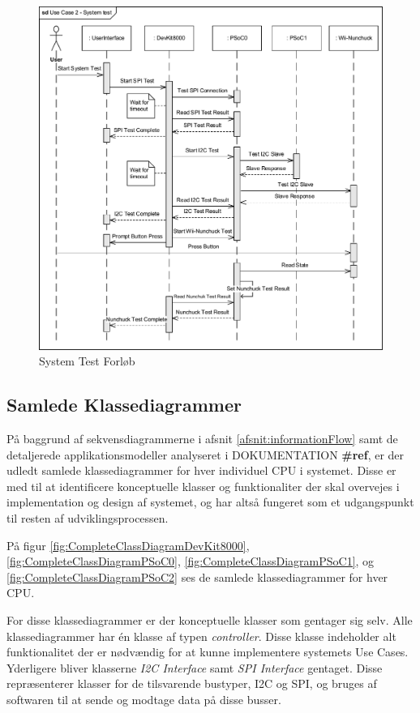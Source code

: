 \begin{figure}[H]
	\centering
	\includegraphics[width=\textwidth] {Systemarkitektur/images/SequenceDiagramUC2}
	\caption{System Test Forløb}
	\label{fig:SystemTestSekvensDiagram}
\end{figure}

\subsection{Samlede Klassediagrammer}
På baggrund af sekvensdiagrammerne i afsnit \ref{afsnit:informationFlow} samt de detaljerede applikationsmodeller analyseret i DOKUMENTATION \textbf{\#ref}, er der udledt samlede klassediagrammer for hver individuel CPU i systemet. Disse er med til at identificere konceptuelle klasser og funktionaliter der skal overvejes i implementation og design af systemet, og har altså fungeret som et udgangspunkt til resten af udviklingsprocessen.

På figur \ref{fig:CompleteClassDiagramDevKit8000}, \ref{fig:CompleteClassDiagramPSoC0}, \ref{fig:CompleteClassDiagramPSoC1}, og \ref{fig:CompleteClassDiagramPSoC2} ses de samlede klassediagrammer for hver CPU.

For disse klassediagrammer er der konceptuelle klasser som gentager sig selv. Alle klassediagrammer har én klasse af typen \textit{controller}. Disse klasse indeholder alt funktionalitet der er nødvændig for at kunne implementere systemets Use Cases. Yderligere bliver klasserne \textit{I2C Interface} samt \textit{SPI Interface} gentaget. Disse repræsenterer klasser for de tilsvarende bustyper, I2C og SPI, og bruges af softwaren til at sende og modtage data på disse busser.


